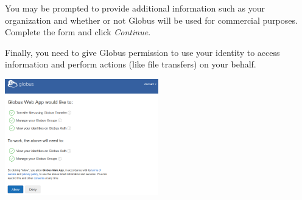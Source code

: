 You may be prompted to provide additional information such as 
your organization and whether or not Globus will be used for 
commercial purposes. Complete the form and click \emph{Continue}.

Finally, you need to give Globus permission to use your identity 
to access information and perform actions (like file transfers) on your behalf.

\begin{center}
\includegraphics[width=0.5\textwidth]{img/access-first-time-login-permissions.png}
\end{center}

